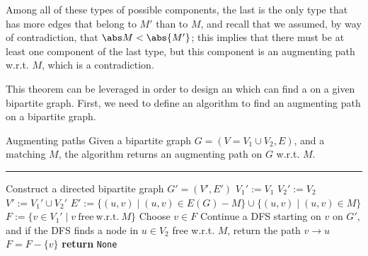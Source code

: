\documentclass[a4paper, 12pt]{report}
\begin{document}
{        Among all of these types of possible components, the last is the only type that has more edges that belong to $M'$ than to $M$, and recall that we assumed, by way of contradiction, that $\abs M < \abs{M'}$; this implies that there must be at least one component of the last type, but this component is an augmenting path w.r.t. $M$, which is a contradiction.
    }

    This theorem can be leveraged in order to design an  which can find a  on a given bipartite graph. First, we need to define an algorithm to find an augmenting path on a bipartite graph.

    \begin{framedalgo}[label={alg:augmenting_path}]{Augmenting paths}
        Given a bipartite graph $G = (V = V_1 \cup V_2, E)$, and a matching $M$, the algorithm returns an augmenting path on $G$ w.r.t. $M$. \\
        \hrule

        \quad
        \begin{algorithmic}[1]
                \State Construct a directed bipartite graph $G' = (V', E')$
                \State $V_1' := V_1$
                \State $V_2' := V_2$
                \State $V' := V_1' \cup V_2'$
                \State $E' := \{(u, v) \mid (u, v) \in E(G) - M\} \cup \{(u, v) \mid (u, v) \in M\}$ 
                \State $F := \{v \in V_1' \mid v \mathrm{\ free \ w.r.t. \ } M\}$
                    \State Choose $v \in F$
                    \State Continue a DFS starting on $v$ on $G'$, and if the DFS finds a node in $u \in V_2$ free w.r.t. $M$, return the path $v \to u$
                    \State $F = F - \{v\}$
                \EndWhile
                \State \textbf{return} \texttt{None}
            \EndFunction
        \end{algorithmic}
    \end{framedalgo}

\end{document}
